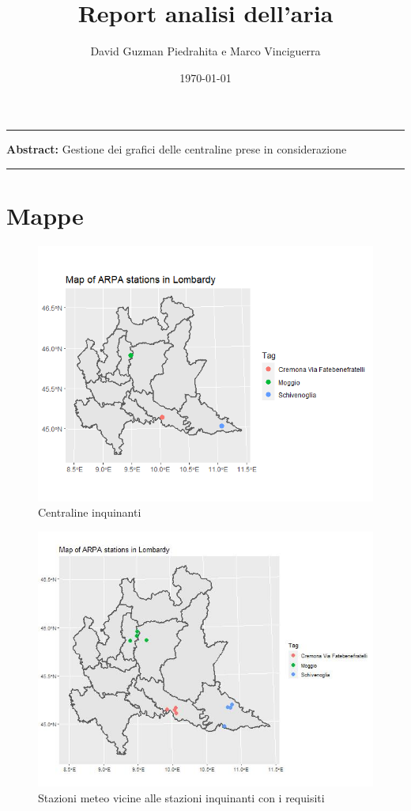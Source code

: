 \documentclass{article}
\title{Report analisi dell'aria}
\author{David Guzman Piedrahita e Marco Vinciguerra}
\date{\today}
\begin{document}
\maketitle

\par\noindent\rule{\textwidth}{0.4pt}
\textbf{Abstract:} Gestione dei grafici delle centraline prese in considerazione
\par\noindent\rule{\textwidth}{0.4pt}
\section{Mappe}
\begin{figure}[H]
  \centering
  \includegraphics[scale = 0.7]{Picture/AQStationsOfInterest.jpeg}
  \caption{Centraline inquinanti}
\end{figure}
\begin{figure}[H]
  \centering
  \includegraphics[scale = 0.4]{Picture/WStationsOfInterestConstrained.jpeg}
  \caption{Stazioni meteo vicine alle stazioni inquinanti con  i requisiti}
\end{figure}
\end{document}

